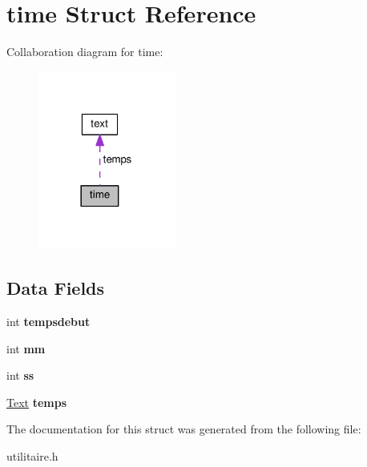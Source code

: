 \hypertarget{structtime}{}\section{time Struct Reference}
\label{structtime}


Collaboration diagram for time\+:\nopagebreak
\begin{figure}[H]
\begin{center}
\leavevmode
\includegraphics[width=129pt]{structtime__coll__graph}
\end{center}
\end{figure}
\subsection*{Data Fields}
\begin{DoxyCompactItemize}
\item 
int {\bfseries tempsdebut}\hypertarget{structtime_a631b29da38929a12fb4997cb6c77ca65}{}\label{structtime_a631b29da38929a12fb4997cb6c77ca65}

\item 
int {\bfseries mm}\hypertarget{structtime_ae3e68d8be9d3f14dec119d67b848fc47}{}\label{structtime_ae3e68d8be9d3f14dec119d67b848fc47}

\item 
int {\bfseries ss}\hypertarget{structtime_a9d94f0d593508ac616752cbe36601004}{}\label{structtime_a9d94f0d593508ac616752cbe36601004}

\item 
\hyperlink{structText}{Text} {\bfseries temps}\hypertarget{structtime_a664308034ded61bae3412c574ad3305c}{}\label{structtime_a664308034ded61bae3412c574ad3305c}

\end{DoxyCompactItemize}


The documentation for this struct was generated from the following file\+:\begin{DoxyCompactItemize}
\item 
utilitaire.\+h\end{DoxyCompactItemize}
